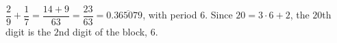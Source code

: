 $\dfrac{2}{9}+\dfrac{1}{7}=\dfrac{14+9}{63}=\dfrac{23}{63}=0.\overline{365079}$, with period $6$. Since $20=3\cdot6+2$, the $20$th digit is the $2$nd digit of the block, $\boxed{6}$.
